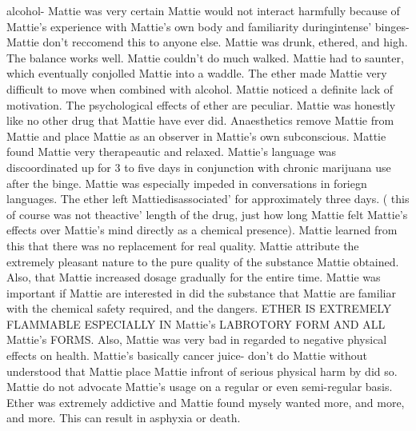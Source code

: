 \documentclass[12pt]{book}
\begin{document}
alcohol- Mattie was very certain Mattie would not interact harmfully because of Mattie's experience with Mattie's own body and familiarity duringintense' binges- Mattie don't reccomend this to anyone else. Mattie was drunk, ethered, and high. The balance works well. Mattie couldn't do much walked. Mattie had to saunter, which eventually conjolled Mattie into a waddle. The ether made Mattie very difficult to move when combined with alcohol. Mattie noticed a definite lack of motivation. The psychological effects of ether are peculiar. Mattie was honestly like no other drug that Mattie have ever did. Anaesthetics remove Mattie from Mattie and place Mattie as an observer in Mattie's own subconscious. Mattie found Mattie very therapeautic and relaxed. Mattie's language was discoordinated up for 3 to five days in conjunction with chronic marijuana use after the binge. Mattie was especially impeded in conversations in foriegn languages. The ether left Mattiedisassociated' for approximately three days. ( this of course was not theactive' length of the drug, just how long Mattie felt Mattie's effects over Mattie's mind directly as a chemical presence). Mattie learned from this that there was no replacement for real quality. Mattie attribute the extremely pleasant nature to the pure quality of the substance Mattie obtained. Also, that Mattie increased dosage gradually for the entire time. Mattie was important if Mattie are interested in did the substance that Mattie are familiar with the chemical safety required, and the dangers. ETHER IS EXTREMELY FLAMMABLE ESPECIALLY IN Mattie's LABROTORY FORM AND ALL Mattie's FORMS. Also, Mattie was very bad in regarded to negative physical effects on health. Mattie's basically cancer juice- don't do Mattie without understood that Mattie place Mattie infront of serious physical harm by did so. Mattie do not advocate Mattie's usage on a regular or even semi-regular basis. Ether was extremely addictive and Mattie found mysely wanted more, and more, and more. This can result in asphyxia or death.
\end{document}
